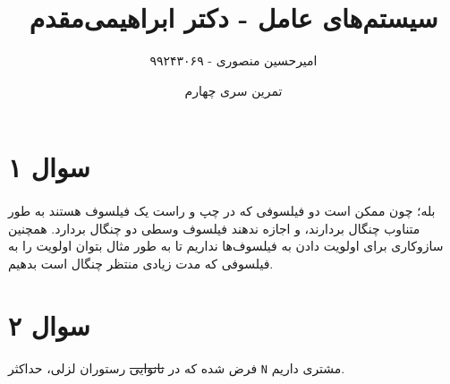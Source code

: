 \documentclass{article}
\title{سیستم‌های عامل - دکتر ابراهیمی‌مقدم}
\author{امیرحسین منصوری - ۹۹۲۴۳۰۶۹}
\date{تمرین سری چهارم}
\begin{document}
	\maketitle

	\section*{سوال ۱}
	\paragraph*{}
	بله؛ چون ممکن است دو فیلسوفی که در چپ و راست یک فیلسوف هستند به طور متناوب چنگال بردارند، و اجازه ندهند فیلسوف وسطی دو چنگال بردارد. همچنین سازوکاری برای اولویت دادن به فیلسوف‌ها نداریم تا به طور مثال بتوان اولویت را به فیلسوفی که مدت زیادی منتظر چنگال است بدهیم.

	\section*{سوال ۲}
	\paragraph*{}

	فرض شده که در
	\sout{نانوایی}
	رستوران لزلی،
	حداکثر
	\verb|N|
	مشتری داریم.

	\lstset{
		basicstyle=\ttfamily,
		numbers=left,
		xleftmargin=15pt,
		numberstyle=\ttfamily,
		autogobble=true,
		tabsize=4
	}
\end{document}
